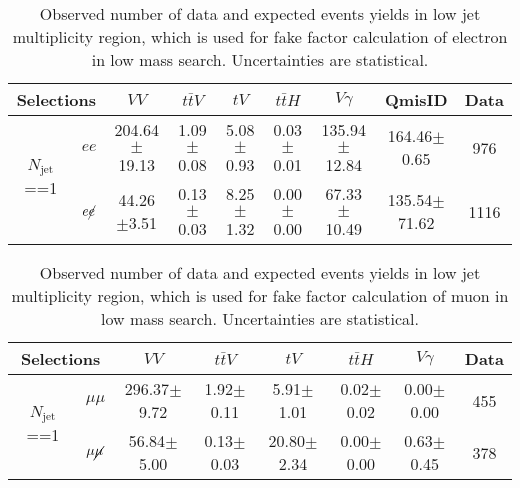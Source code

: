 \begin{table}[!ht]
\begin{center}
\small
\begin{tabular}{c|c|cccc|c|c|c}
\hline
\hline
\multicolumn{2}{c|}{ Selections} &$VV$  &$t\bar{t}V$    &$tV$    &$t\bar{t}H$     &$V\gamma$  &QmisID  &Data \\
\hline
\multirow{2}{*}{$N_\text{jet}$ ==1}  &$ee$  &204.64$\pm$19.13 &1.09$\pm$0.08&5.08$\pm$0.93&0.03$\pm$0.01&135.94$\pm$12.84&164.46$\pm$0.65 &976\\
\cline{2-9}
                &$e\cancel{e}$ &44.26$\pm$3.51    &0.13$\pm$0.03  &8.25$\pm$1.32 &0.00$\pm$0.00  &67.33$\pm$10.49  &135.54$\pm$71.62    &1116\\
\hline
\hline
\end{tabular}
\caption{Observed number of data and expected events yields in low jet multiplicity region, which is used for fake factor calculation of electron in low mass search. Uncertainties are statistical.}
\end{center}
\end{table}

\begin{table}[!ht]
\begin{center}
\small
\begin{tabular}{c|c|cccc|c|c}
\hline
\hline
\multicolumn{2}{c|}{ Selections} &$VV$  &$t\bar{t}V$    &$tV$    &$t\bar{t}H$     &$V\gamma$    &Data \\
\hline
\multirow{2}{*}{$N_\text{jet}$ ==1}  &$\mu\mu$ &296.37$\pm$9.72    &1.92$\pm$0.11    &5.91$\pm$1.01    &0.02$\pm$0.02    &0.00$\pm$0.00 &455\\
\cline{2-8}
                  &$\mu\cancel{\mu}$ &56.84$\pm$5.00    &0.13$\pm$0.03    &20.80$\pm$2.34    &0.00$\pm$0.00    &0.63$\pm$0.45    &378\\
\hline
\hline
\end{tabular}
\caption{Observed number of data and expected events yields in low jet multiplicity region, which is used for fake factor calculation of muon in low mass search. Uncertainties are statistical.}
\end{center}
\end{table}

